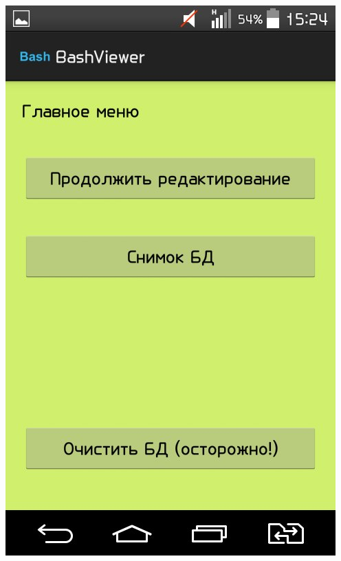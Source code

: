 \documentclass[t]{beamer}
\begin{document}
\begin{frame}
		~~~~~~~
		{\includegraphics[scale = 0.17]{images/Bash1.jpg}
}
\end{frame}
\end{document}

